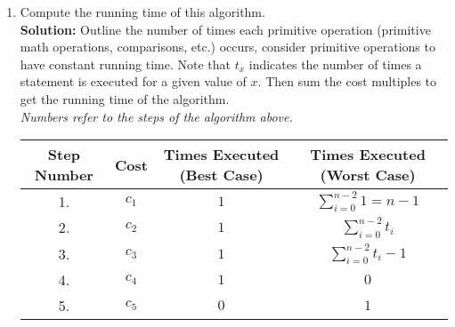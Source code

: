 \documentclass[11pts]{article}
\begin{document}
\begin{enumerate}
\begin{enumerate}
  \item Compute the running time of this algorithm. \\

  \textbf{Solution:} Outline the number of times each primitive operation
  (primitive math operations, comparisons, etc.) occurs, consider primitive
  operations to have constant running time. Note that $t_x$ indicates the
  number of times a statement is executed for a given value of $x$. Then sum
  the cost multiples to get the running time of the algorithm. \\

  \textit{ Numbers refer to the steps of the algorithm above.}
    \begin{center}
    \begin{tabular}{| c || c | c | c |}
      \hline
      Step Number & Cost & Times Executed (Best Case)
          & Times Executed (Worst Case)  \\
      \hline \hline
      1.          & $c_1$  & $1$ & $\sum_{i=0}^{n-2}{1} = n - 1$  \\
      \hline
      2.          & $c_2$  & $1$ & $\sum_{i=0}^{n-2}{t_i} $ \\
      \hline
      3.          & $c_3$  & $1$ & $\sum_{i=0}^{n-2}{t_i - 1}$  \\
      \hline
      4.          & $c_4$  & $1$ & $0$  \\
      \hline
      5.          & $c_5$  & $0$ & $1$  \\
      \hline
    \end{tabular}
    \end{center}


\end{enumerate}
\end{enumerate}
\end{document}
